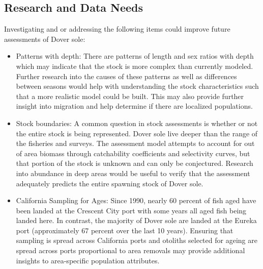 \documentclass[11pt,
  english,
  a4paper,
]{article}
\begin{document}
\endgroup{}


\hypertarget{research-and-data-needs}{%
\subsection*{Research and Data Needs}\label{research-and-data-needs}}

\leavevmode\tagmcend\tagstructend


Investigating and or addressing the following items could improve future assessments of Dover sole:

\leavevmode\tagmcend\tagstructend\par

\begin{itemize}

\item Patterns with depth:  There are patterns of length and sex ratios with depth which may indicate that the stock is more complex than currently modeled.  Further research into the causes of these patterns as well as differences between seasons would help with understanding the stock characteristics such that a more realistic model could be built.  This may also provide further insight into migration and help determine if there are localized populations.

\item Stock boundaries: A common question in stock assessments is whether or not the entire stock is being represented. Dover sole live deeper than the range of the fisheries and surveys.  The assessment model attempts to account for out of area biomass through catchability coefficients and selectivity curves, but that portion of the stock is unknown and can only be conjectured.  Research into abundance in deep areas would be useful to verify that the assessment adequately predicts the entire spawning stock of Dover sole.

\item California Sampling for Ages: Since 1990, nearly 60 percent of fish aged have been landed at the Crescent City port with some years all aged fish being landed here. In contrast, the majority of Dover sole are landed at the Eureka port (approximately 67 percent over the last 10 years). Ensuring that sampling is spread across California ports and otoliths selected for ageing are spread across ports proportional to area removals may provide additional insights to area-specific population attributes.

\end{itemize}
\end{document}
